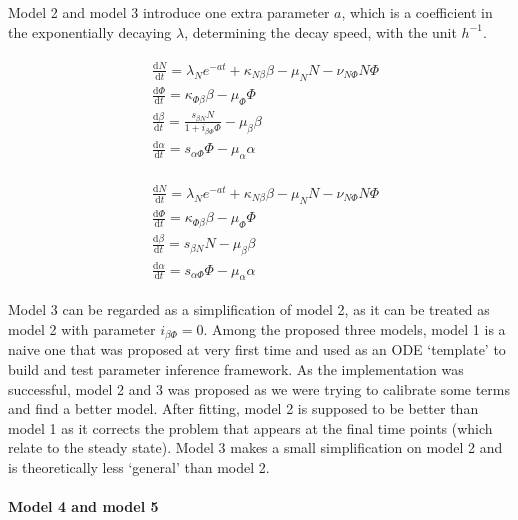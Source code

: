 \documentclass[12pt,a4paper]{report}
\begin{document}
Model 2 and model 3 introduce one extra parameter $a$, which is a coefficient in the exponentially decaying $\lambda$, determining the decay speed, with the unit $h^{-1}$.

\begin{align}
    \label{eq:model2}
    \begin{split}
        &\frac{\mathrm{d} N}{\mathrm{d} t}=\lambda_Ne^{-at}+\kappa_{N\beta}\beta-\mu_NN-\nu_{N\Phi}N\Phi\\
        &\frac{\mathrm{d} \Phi}{\mathrm{d} t}=\kappa_{\Phi\beta}\beta-\mu_\Phi\Phi\\
        &\frac{\mathrm{d} \beta}{\mathrm{d} t}=\frac{s_{\beta N}N}{1+i_{\beta\Phi}\Phi}-\mu_\beta\beta\\
        &\frac{\mathrm{d} \alpha}{\mathrm{d} t}=s_{\alpha\Phi}\Phi-\mu_\alpha\alpha
    \end{split}
\end{align}

\begin{align}
    \label{eq:model3}
    \begin{split}
        &\frac{\mathrm{d} N}{\mathrm{d} t}=\lambda_Ne^{-at}+\kappa_{N\beta}\beta-\mu_NN-\nu_{N\Phi}N\Phi\\
        &\frac{\mathrm{d} \Phi}{\mathrm{d} t}=\kappa_{\Phi\beta}\beta-\mu_\Phi\Phi\\
        &\frac{\mathrm{d} \beta}{\mathrm{d} t}=s_{\beta N}N-\mu_\beta\beta\\
        &\frac{\mathrm{d} \alpha}{\mathrm{d} t}=s_{\alpha\Phi}\Phi-\mu_\alpha\alpha
    \end{split}
\end{align}

Model 3 can be regarded as a simplification of model 2, as it can be treated as model 2 with parameter $i_{\beta\Phi}=0$. Among the proposed three models, model 1 is a naive one that was proposed at very first time and used as an ODE `template' to build and test parameter inference framework. As the implementation was successful, model 2 and 3 was proposed as we were trying to calibrate some terms and find a better model. After fitting, model 2 is supposed to be better than model 1 as it corrects the problem that appears at the final time points (which relate to the steady state). Model 3 makes a small simplification on model 2 and is theoretically less `general' than model 2.

\paragraph{Model 4 and model 5}
\end{document}
